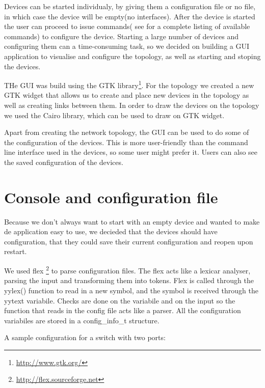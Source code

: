 Devices can be started individualy, by giving them a configuration file or no file, in which case the device
will be empty(no interfaces). After the device is started the user can proceed to issue commands( see  
for a complete listing of available commands) to configure the device. Starting a large number of
devices and configuring them can a time-consuming task, so we decided on building a GUI application to visualise and configure
the topology, as well as starting and stoping the devices.


THe GUI was build using the GTK library\footnote{\url{http://www.gtk.org/}}. For the topology we created a new GTK widget
that allows us to create and place new devices in the topology as well as creating links between them. In order to draw
the devices on the topology we used the Cairo library, which can be used to draw on GTK widget.

Apart from creating the network topology, the GUI can be used to do some of the configuration of the devices. This is 
more user-friendly than the command line interface used in the devices, so some user might prefer it. Users can also see
the saved configuration of the devices.

\section{Console and configuration file}
\label{sec:dev-conf}

Because we don't always want to start with an empty device and wanted to make de application easy to use, we decieded that the
devices should have configuration, that they could save their current configuration and reopen upon restart. 

We used flex \footnote{\url{http://flex.sourceforge.net}} to parse configuration files. The flex acts like a lexicar analyser, 
parsing the input and transforming them into tokens. Flex is called through the yylex() function to read in a new symbol, and the
symbol is received through the yytext variabile. Checks are done on the variabile and on the input so the function that reads in 
the config file acts like a parser. All the configuration variabiles are stored in a config_info_t structure.

A sample configuration for a switch with two ports:
\lstset{language=inform,caption=Example switch configuration file,label=lst:dconf}


